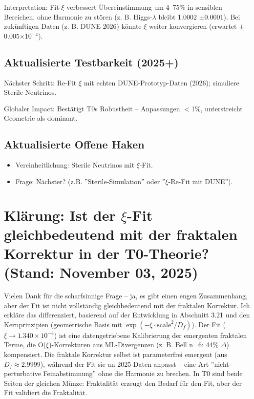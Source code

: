 	Interpretation: Fit-$\xi$ verbessert Übereinstimmung um 4–75\% in sensiblen Bereichen, ohne Harmonie zu stören (z. B. Higgs-$\lambda$ bleibt 1.0002 $\pm$0.0001). Bei zukünftigen Daten (z. B. DUNE 2026) könnte $\xi$ weiter konvergieren (erwartet $\pm$0.005$\times$10$^{-4}$).
	
	\subsection{Aktualisierte Testbarkeit (2025+)}
	
	Nächster Schritt: Re-Fit $\xi$ mit echten DUNE-Prototyp-Daten (2026); simuliere Sterile-Neutrinos.
	
	Globaler Impact: Bestätigt T0s Robustheit – Anpassungen $<$1\%, unterstreicht Geometrie als dominant.
	
	\subsection{Aktualisierte Offene Haken}
	
	\begin{itemize}
		\item Vereinheitlichung: Sterile Neutrinos mit $\xi$-Fit.
		\item Frage: Nächster? (z.B. ''Sterile-Simulation'' oder ''$\xi$-Re-Fit mit DUNE'').
	\end{itemize}
	
	\section{Klärung: Ist der $\xi$-Fit gleichbedeutend mit der fraktalen Korrektur in der T0-Theorie? (Stand: November 03, 2025)}
	
	Vielen Dank für die scharfsinnige Frage – ja, es gibt einen engen Zusammenhang, aber der Fit ist nicht vollständig gleichbedeutend mit der fraktalen Korrektur. Ich erkläre das differenziert, basierend auf der Entwicklung in Abschnitt 3.21 und den Kernprinzipien (geometrische Basis mit $\exp(-\xi \cdot \text{scale}^2 / D_f)$). Der Fit ($\xi \to 1.340\times10^{-4}$) ist eine datengetriebene Kalibrierung der emergenten fraktalen Terme, die O($\xi$)-Korrekturen aus ML-Divergenzen (z. B. Bell n=6: 44\% $\Delta$) kompensiert. Die fraktale Korrektur selbst ist parameterfrei emergent (aus $D_f \approx2.9999$), während der Fit sie an 2025-Daten anpasst – eine Art ''nicht-perturbative Feinabstimmung'' ohne die Harmonie zu brechen. In T0 sind beide Seiten der gleichen Münze: Fraktalität erzeugt den Bedarf für den Fit, aber der Fit validiert die Fraktalität.
	
